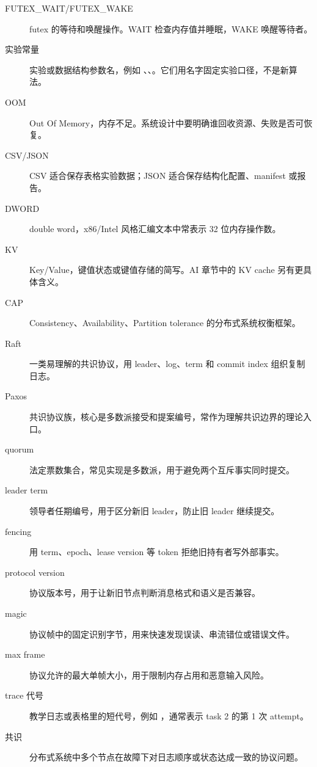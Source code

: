 \begin{description}
\item[FUTEX\_WAIT/FUTEX\_WAKE] futex 的等待和唤醒操作。WAIT 检查内存值并睡眠，WAKE 唤醒等待者。
\item[实验常量] 实验或数据结构参数名，例如 、、。它们用名字固定实验口径，不是新算法。
\item[OOM] Out Of Memory，内存不足。系统设计中要明确谁回收资源、失败是否可恢复。
\item[CSV/JSON] CSV 适合保存表格实验数据；JSON 适合保存结构化配置、manifest 或报告。
\item[DWORD] double word，x86/Intel 风格汇编文本中常表示 32 位内存操作数。
\item[KV] Key/Value，键值状态或键值存储的简写。AI 章节中的 KV cache 另有更具体含义。
\item[CAP] Consistency、Availability、Partition tolerance 的分布式系统权衡框架。
\item[Raft] 一类易理解的共识协议，用 leader、log、term 和 commit index 组织复制日志。
\item[Paxos] 共识协议族，核心是多数派接受和提案编号，常作为理解共识边界的理论入口。
\item[quorum] 法定票数集合，常见实现是多数派，用于避免两个互斥事实同时提交。
\item[leader term] 领导者任期编号，用于区分新旧 leader，防止旧 leader 继续提交。
\item[fencing] 用 term、epoch、lease version 等 token 拒绝旧持有者写外部事实。
\item[protocol version] 协议版本号，用于让新旧节点判断消息格式和语义是否兼容。
\item[magic] 协议帧中的固定识别字节，用来快速发现误读、串流错位或错误文件。
\item[max frame] 协议允许的最大单帧大小，用于限制内存占用和恶意输入风险。
\item[trace 代号] 教学日志或表格里的短代号，例如 ，通常表示 task 2 的第 1 次 attempt。
\item[共识] 分布式系统中多个节点在故障下对日志顺序或状态达成一致的协议问题。
\end{description}
